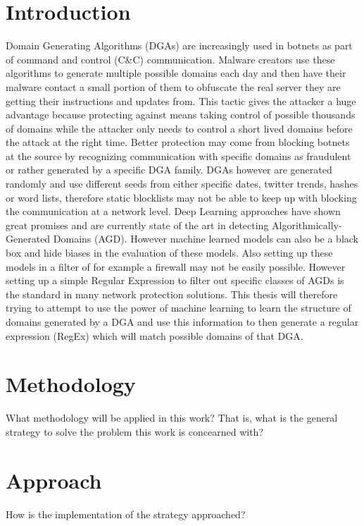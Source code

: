 \documentclass[a4paper, 12pt]{article}
\begin{document}
\section{Introduction}
Domain Generating Algorithms (DGAs) are increasingly used in botnets as part of
command and control (C\&C) communication. Malware creators use these algorithms
to generate multiple possible domains each day and then have their malware
contact a small portion of them to obfuscate the real server they are getting
their instructions and updates from. This tactic gives the attacker a huge
advantage because protecting against means taking control of possible thousands
of domains while the attacker only needs to control a short lived domains
before the attack at the right time. Better protection may come from blocking
botnets at the source by recognizing communication with specific domains as
fraudulent or rather generated by a specific DGA family. DGAs however are
generated randomly and use different seeds from either specific dates, twitter
trends, hashes or word lists, therefore static blocklists may not be able to
keep up with blocking the communication at a network level. Deep Learning
approaches have shown great promises and are currently state of the art in
detecting Algorithmically-Generated Domains (AGD). 
However machine learned models can also be a black box and hide biases in the evaluation 
of these models. Also setting up these models in a filter of for example a firewall may
not be easily possible. However setting up a simple Regular Expression to filter out specific classes of AGDs
is the standard in many network protection solutions.
This thesis will therefore trying to attempt to use the power of machine learning to learn the structure
of domains generated by a DGA and use this information to then generate a regular expression (RegEx) 
which will match possible domains of that DGA. 


\section{Methodology}
What methodology will be applied in this work? That is, what is the general
strategy to solve the problem this work is concearned with?

\section{Approach}
How is the implementation of the strategy approached?
\end{document}
